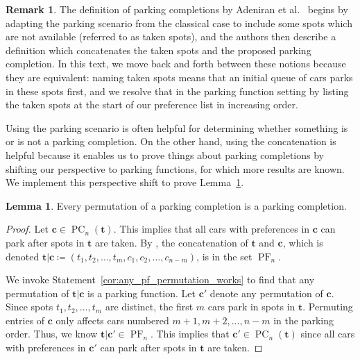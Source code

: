 \documentclass{amsart}
\theoremstyle{definition}
\newtheorem{lemma}[theorem]{Lemma}
\newtheorem{remark}[theorem]{Remark}
\numberwithin{equation}{section}
\newcommand{\PF}{\operatorname{PF}} %
\newcommand{\PC}{\operatorname{PC}} %
\begin{document}
\begin{remark}
    The definition of parking completions by Adeniran et al.\ \cite{bib:ParkingCompletions} begins by adapting the parking scenario from the classical case to include some spots which are not available (referred to as taken spots), and the authors then describe a definition which concatenates the taken spots and the proposed parking completion. 
    In this text, we move back and forth between these notions because they are equivalent: naming taken spots means that an initial queue of cars parks in these spots first, and we resolve that in the parking function setting by listing the taken spots at the start of our preference list in increasing order.
    
    Using the parking scenario is often helpful for determining whether something is or is not a parking completion.
    On the other hand, using the concatenation is helpful because it enables us to prove things about parking completions by shifting our perspective to parking functions, for which more results are known. %
    We implement this perspective shift to prove Lemma~\ref{lem:any_pc_permutation_works}.
\end{remark}

\begin{lemma}\label{lem:any_pc_permutation_works}
    Every permutation of a parking completion is a parking completion.
\end{lemma}
\begin{proof}
Let $\mathbf{c} \in \PC_n(\mathbf{t})$.
This implies that all cars with preferences in $\mathbf{c}$ can park after spots in $\mathbf{t}$ are taken.
By , the concatenation of $\mathbf{t}$ and $\mathbf{c}$, which is denoted $\mathbf{t}|\mathbf{c} \coloneqq (t_1, t_2, \hdots, t_m, c_1, c_2, \hdots, c_{n-m})$, is in the set $\PF_n$.

We invoke Statement~\ref{cor:any_pf_permutation_works} to find that any permutation of $\mathbf{t}|\mathbf{c}$ is a parking function.
Let $\mathbf{c}'$ denote any permutation of $\mathbf{c}$.
Since spots $t_1, t_2, \hdots, t_m$ are distinct, the first $m$ cars park in spots in $\mathbf{t}$.
Permuting entries of $\mathbf{c}$ only affects cars numbered $m+1, m+2, \hdots, n-m$ in the parking order.
Thus, we know $\mathbf{t}|\mathbf{c}' \in \PF_n$.
This implies that $\mathbf{c}' \in \PC_n(\mathbf{t})$ since all cars with preferences in $\mathbf{c}'$ can park after spots in $\mathbf{t}$ are taken.
\end{proof}
\end{document}

